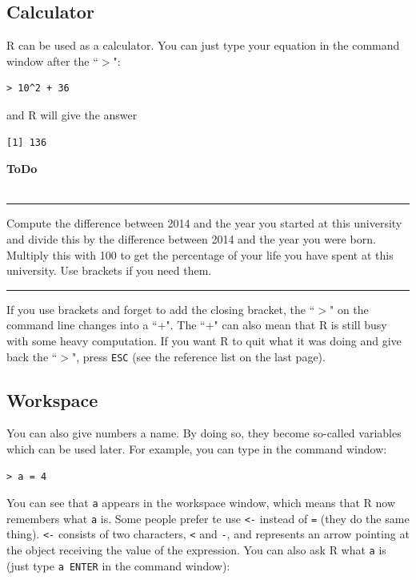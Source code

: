 \documentclass[a4paper,11pt,twocolumn,tablecaptionabove]{scrartcl}
\makeatletter
\newenvironment{ToDo} {%
  \begin{flushright}
    \hfill
    \begin{minipage}{0.95\columnwidth}         %
    \textsf{\textbf{ToDo}} \\
      \vspace{-0.85cm}\\
      {\color{Gray}\rule[-0.1cm]{\columnwidth}{1.5pt}}} { %
      {\color{Gray} \rule[0.3cm]{\columnwidth}{1.5pt}}
    \end{minipage}
    \vspace{1em}
  \end{flushright}
  }
\let\SF@@footnote\footnote
\def\footnote{\ifx\protect\@typeset@protect
 \expandafter\SF@@footnote
 \else
 \expandafter\SF@gobble@opt
 \fi
}
\edef\SF@gobble@opt{\noexpand\protect
 \expandafter\noexpand\csname SF@gobble@opt \endcsname}
\makeatother
\begin{document}
\subsection{Calculator}

R can be used as a calculator. You can just type your equation in the command window after the ``$>$":
\begin{Verbatim}[frame=single,gobble=0]
> 10^2 + 36
\end{Verbatim}
and R will give the answer
\begin{Verbatim}[frame=single,gobble=0]
[1] 136
\end{Verbatim}

\begin{ToDo}
Compute the difference between 2014 and the year you started at this university and divide this by the difference between 2014 and the year you were born. Multiply this with 100 to get the percentage of your life you have spent at this university. Use brackets if you need them. \\
\end{ToDo}

If you use brackets and forget to add the closing bracket, the ``$>$" on the command line changes into a ``+". The ``+" can also mean that R is still busy with some  heavy computation. If you want R to quit what it was doing and give back the ``$>$", press \texttt{ESC} (see the reference list on the last page). 

\subsection{Workspace}

You can also give numbers a name. By doing so, they become so-called variables which can be used later. For example, you can type in the command window: 
\begin{Verbatim}[frame=single,gobble=0]
> a = 4
\end{Verbatim}
You can see that \texttt{a} appears in the workspace window, which means that R now remembers what \texttt{a} is.\footnote{Some people prefer te use \texttt{<-} instead of \texttt{=} (they do the same thing). \texttt{<-} consists of two characters, \texttt{<} and \texttt{-}, and represents an arrow pointing at the object receiving the value of the expression.} You can also ask R what \texttt{a} is (just type \texttt{a ENTER} in the command window):
\end{document}

